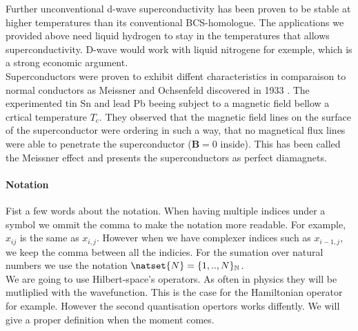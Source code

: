 \documentclass[../main.tex]{subfile}
\begin{document}
Further unconventional d-wave superconductivity has been proven to be stable at higher temperatures than its conventional BCS-homologue.
The applications we provided above need liquid hydrogen to stay in the temperatures that allows superconductivity. D-wave
would work with liquid nitrogene for exemple, which is a strong economic argument.\\

Superconductors were proven to exhibit diffent characteristics in comparaison to normal conductors as
Meissner and Ochsenfeld discovered in 1933 \cite{MeissnerOchsenfeld1933}. 
The experimented tin Sn and lead Pb beeing subject to a magnetic field bellow a crtical temperature $T_c$. They observed that the magnetic field lines on the surface
of the superconductor were ordering in such a way, that no magnetical flux lines were able to penetrate the superconductor ($\bm{B} = 0$ inside). This has been called the Meissner effect
and presents the superconductors as perfect diamagnets.\\

\paragraph{Notation}$~$\\
Fist a few words about the notation. When having multiple indices under a symbol we ommit the comma to make the notation more readable. 
For example, $x_{ij}$ is the same as $x_{i,j}$. However when we have complexer indices such as $x_{i-1, j}$, we keep the comma between all
the indicies. For the sumation over natural numbers we use the notation $\natset{N} = \{1,..,N\}_{\mathbb{N}}$.\\

We are going to use Hilbert-space's operators. As often in physics they will be mutliplied with the wavefunction. This is the case for the Hamiltonian 
operator for example. However the second quantisation opertors works diffently. We will give a proper definition when the moment comes.
\end{document}
